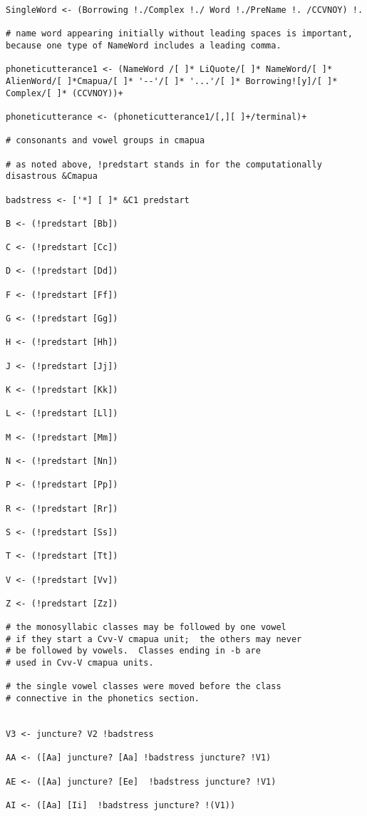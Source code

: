 \documentclass{article}
\begin{document}
\begin{verbatim}
SingleWord <- (Borrowing !./Complex !./ Word !./PreName !. /CCVNOY) !.

# name word appearing initially without leading spaces is important, because one type of NameWord includes a leading comma.

phoneticutterance1 <- (NameWord /[ ]* LiQuote/[ ]* NameWord/[ ]* AlienWord/[ ]*Cmapua/[ ]* '--'/[ ]* '...'/[ ]* Borrowing![y]/[ ]* Complex/[ ]* (CCVNOY))+

phoneticutterance <- (phoneticutterance1/[,][ ]+/terminal)+

# consonants and vowel groups in cmapua

# as noted above, !predstart stands in for the computationally disastrous &Cmapua

badstress <- ['*] [ ]* &C1 predstart

B <- (!predstart [Bb])

C <- (!predstart [Cc])

D <- (!predstart [Dd])

F <- (!predstart [Ff])

G <- (!predstart [Gg])

H <- (!predstart [Hh])

J <- (!predstart [Jj])

K <- (!predstart [Kk])

L <- (!predstart [Ll])

M <- (!predstart [Mm])

N <- (!predstart [Nn])

P <- (!predstart [Pp])

R <- (!predstart [Rr])

S <- (!predstart [Ss])

T <- (!predstart [Tt])

V <- (!predstart [Vv])

Z <- (!predstart [Zz])

# the monosyllabic classes may be followed by one vowel
# if they start a Cvv-V cmapua unit;  the others may never
# be followed by vowels.  Classes ending in -b are
# used in Cvv-V cmapua units.

# the single vowel classes were moved before the class
# connective in the phonetics section.


V3 <- juncture? V2 !badstress

AA <- ([Aa] juncture? [Aa] !badstress juncture? !V1)  

AE <- ([Aa] juncture? [Ee]  !badstress juncture? !V1)  

AI <- ([Aa] [Ii]  !badstress juncture? !(V1))  


\end{verbatim}
\end{document}
